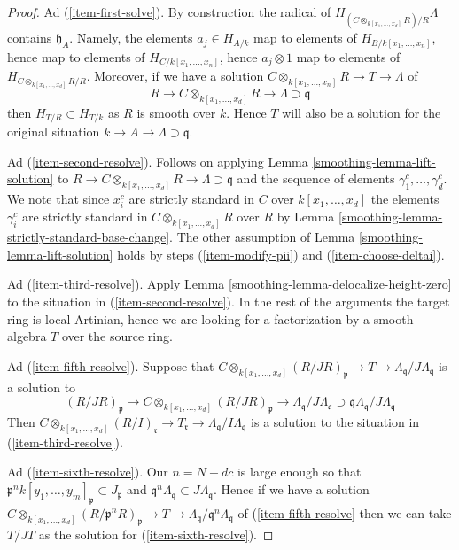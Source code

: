 \begin{proof}
\medskip\noindent
Ad (\ref{item-first-solve}). By construction the radical of
$H_{(C \otimes_{k[x_1, \ldots, x_d]} R)/R} \Lambda$ contains
$\mathfrak h_A$. Namely, the elements $a_j \in H_{A/k}$
map to elements of $H_{B/k[x_1, \ldots, x_n]}$, hence map to elements
of $H_{C/k[x_1, \ldots, x_n]}$, hence $a_j \otimes 1$ map to elements of
$H_{C \otimes_{k[x_1, \ldots, x_d]} R/R}$. Moreover, if we have a solution
$C \otimes_{k[x_1, \ldots, x_n]} R \to T \to \Lambda$ of
$$
R
\to
C \otimes_{k[x_1, \ldots, x_d]} R
\to
\Lambda \supset \mathfrak q
$$
then $H_{T/R} \subset H_{T/k}$ as $R$ is smooth over $k$.
Hence $T$ will also be a solution for
the original situation $k \to A \to \Lambda \supset \mathfrak q$.

\medskip\noindent
Ad (\ref{item-second-resolve}). Follows on applying
Lemma \ref{smoothing-lemma-lift-solution} to
$R \to C \otimes_{k[x_1, \ldots, x_d]} R
\to \Lambda \supset \mathfrak q$ and the sequence of
elements $\gamma_1^c, \ldots, \gamma_d^c$. We note that since $x_i^c$
are strictly standard in $C$ over $k[x_1, \ldots, x_d]$ the elements
$\gamma_i^c$ are strictly standard in $C \otimes_{k[x_1, \ldots, x_d]} R$
over $R$ by Lemma \ref{smoothing-lemma-strictly-standard-base-change}.
The other assumption of Lemma \ref{smoothing-lemma-lift-solution} holds by steps
(\ref{item-modify-pii}) and (\ref{item-choose-deltai}).

\medskip\noindent
Ad (\ref{item-third-resolve}). Apply Lemma \ref{smoothing-lemma-delocalize-height-zero}
to the situation in (\ref{item-second-resolve}). In the rest of the
arguments the target ring is local Artinian, hence we are looking for
a factorization by a smooth algebra $T$ over the source ring.

\medskip\noindent
Ad (\ref{item-fifth-resolve}).
Suppose that $C \otimes_{k[x_1, \ldots, x_d]} (R/JR)_\mathfrak p \to
T \to \Lambda_\mathfrak q/J\Lambda_\mathfrak q$ is a solution to
$$
(R/JR)_\mathfrak p \to
C \otimes_{k[x_1, \ldots, x_d]} (R/JR)_\mathfrak p \to
\Lambda_\mathfrak q/J\Lambda_\mathfrak q
\supset
\mathfrak q\Lambda_\mathfrak q/J\Lambda_\mathfrak q
$$
Then $C \otimes_{k[x_1, \ldots, x_d]} (R/I)_\mathfrak r \to T_\mathfrak r \to
\Lambda_\mathfrak q/I\Lambda_\mathfrak q$
is a solution to the situation in (\ref{item-third-resolve}).

\medskip\noindent
Ad (\ref{item-sixth-resolve}). Our $n = N + dc$ is large enough so that
$\mathfrak p^nk[y_1, \ldots, y_m]_\mathfrak p \subset J_\mathfrak p$
and $\mathfrak q^n \Lambda_\mathfrak q \subset J\Lambda_\mathfrak q$.
Hence if we have a solution
$C \otimes_{k[x_1, \ldots, x_d]} (R/\mathfrak p^nR)_\mathfrak p \to
T \to \Lambda_\mathfrak q/\mathfrak q^n\Lambda_\mathfrak q$
of (\ref{item-fifth-resolve}
then we can take $T/JT$ as the solution for
(\ref{item-sixth-resolve}).


\end{proof}
